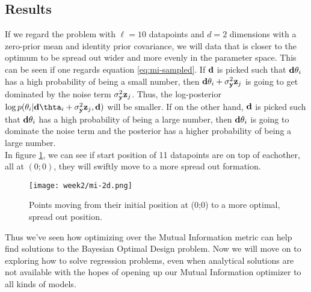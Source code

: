 \subsection{Results}
If we regard the problem with $\ell = 10$ datapoints and $d=2$ dimensions with a zero-prior mean and identity prior covariance, 
we will data that is closer to the optimum to be spread out wider and more evenly in the parameter space.
This can be seen if one regards equation \ref{eq:mi-sampled}. 
If $\mathbf{d}$ is picked such that $\mathbf{d}\theta_i$ has a high probability of being a small number, then
$\mathbf{d}\theta_i + \sigma^2_{\mathbf{y}}\mathbf{z}_j$ is going to get dominated by the noise term $\sigma^2_{\mathbf{y}}\mathbf{z}_j$.
Thus, the log-posterior $\log p(\theta_i | \B{d}\thta_i + \sigma^2_\B{y}\B{z}_j, \B{d})$ will be smaller.
If on the other hand, $\mathbf{d}$ is picked such that $\mathbf{d}\theta_i$ has a high probability of being a large number, then $\mathbf{d}\theta_i$ is going to dominate the noise term
and the posterior has a higher probability of being a large number.\\
In figure \ref{fig:mi-2d}, we can see if start position of 11 datapoints are on top of eachother, all at $(0;0)$, they will swiftly move to a more spread out formation.
\begin{figure}
  \centering
  \texttt{[image: week2/mi-2d.png]}
  \caption{Points moving from their initial position at (0;0) to a more optimal, spread out position.}
  \label{fig:mi-2d}
\end{figure}
Thus we've seen how optimizing over the Mutual Information metric can help find solutions to the Bayesian Optimal Design problem.
Now we will move on to exploring how to solve regression problems, even when analytical solutions are not available with the hopes of opening up our Mutual Information optimizer to all kinds of models.
